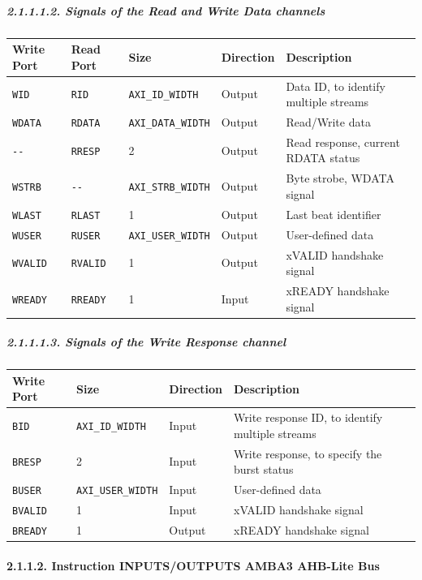 \documentclass[
]{article}
\begin{document}
\hypertarget{signals-of-the-read-and-write-data-channels}{%
\subparagraph{2.1.1.1.2. Signals of the Read and Write Data
channels}\label{signals-of-the-read-and-write-data-channels}}

\begin{longtable}[]{@{}lllll@{}}
\toprule
Write Port & Read Port & Size & Direction & Description\tabularnewline
\midrule
\endhead
\texttt{WID} & \texttt{RID} & \texttt{AXI\_ID\_WIDTH} & Output & Data
ID, to identify multiple streams\tabularnewline
\texttt{WDATA} & \texttt{RDATA} & \texttt{AXI\_DATA\_WIDTH} & Output &
Read/Write data\tabularnewline
\texttt{-\/-} & \texttt{RRESP} & 2 & Output & Read response, current
RDATA status\tabularnewline
\texttt{WSTRB} & \texttt{-\/-} & \texttt{AXI\_STRB\_WIDTH} & Output &
Byte strobe, WDATA signal\tabularnewline
\texttt{WLAST} & \texttt{RLAST} & 1 & Output & Last beat
identifier\tabularnewline
\texttt{WUSER} & \texttt{RUSER} & \texttt{AXI\_USER\_WIDTH} & Output &
User-defined data\tabularnewline
\texttt{WVALID} & \texttt{RVALID} & 1 & Output & xVALID handshake
signal\tabularnewline
\texttt{WREADY} & \texttt{RREADY} & 1 & Input & xREADY handshake
signal\tabularnewline
\bottomrule
\end{longtable}

\hypertarget{signals-of-the-write-response-channel}{%
\subparagraph{2.1.1.1.3. Signals of the Write Response
channel}\label{signals-of-the-write-response-channel}}

\begin{longtable}[]{@{}llll@{}}
\toprule
Write Port & Size & Direction & Description\tabularnewline
\midrule
\endhead
\texttt{BID} & \texttt{AXI\_ID\_WIDTH} & Input & Write response ID, to
identify multiple streams\tabularnewline
\texttt{BRESP} & 2 & Input & Write response, to specify the burst
status\tabularnewline
\texttt{BUSER} & \texttt{AXI\_USER\_WIDTH} & Input & User-defined
data\tabularnewline
\texttt{BVALID} & 1 & Input & xVALID handshake signal\tabularnewline
\texttt{BREADY} & 1 & Output & xREADY handshake signal\tabularnewline
\bottomrule
\end{longtable}

\hypertarget{instruction-inputsoutputs-amba3-ahb-lite-bus}{%
\paragraph{2.1.1.2. Instruction INPUTS/OUTPUTS AMBA3 AHB-Lite
Bus}\label{instruction-inputsoutputs-amba3-ahb-lite-bus}}
\end{document}
